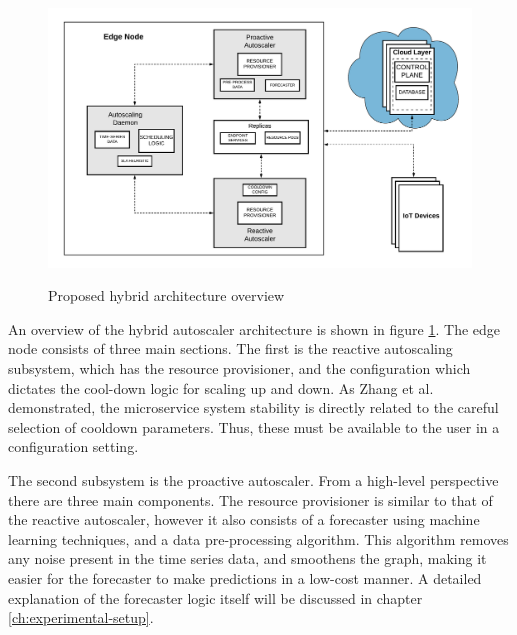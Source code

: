 \begin{figure}[htb]
    \centering
    \caption{Proposed hybrid architecture overview}
    \includegraphics[width=1.0\linewidth]{Figures/Hybrid-Architecture-Overview.pdf}
    \label{fig:hybrid-arch-overview}
\end{figure}

An overview of the hybrid autoscaler architecture is shown in figure \ref{fig:hybrid-arch-overview}. The edge node consists of three main sections. The first is the reactive autoscaling subsystem, which has the resource provisioner, and the configuration which dictates the cool-down logic for scaling up and down. As Zhang et al. \cite{zhang2019quantifying} demonstrated, the microservice system stability is directly related to the careful selection of cooldown parameters. Thus, these must be available to the user in a configuration setting.\par

The second subsystem is the proactive autoscaler. From a high-level perspective there are three main components. The resource provisioner is similar to that of the reactive autoscaler, however it also consists of a forecaster using machine learning techniques, and a data pre-processing algorithm. This algorithm removes any noise present in the time series data, and smoothens the graph, making it easier for the forecaster to make predictions in a low-cost manner. A detailed explanation of the forecaster logic itself will be discussed in chapter \ref{ch:experimental-setup}.\par

